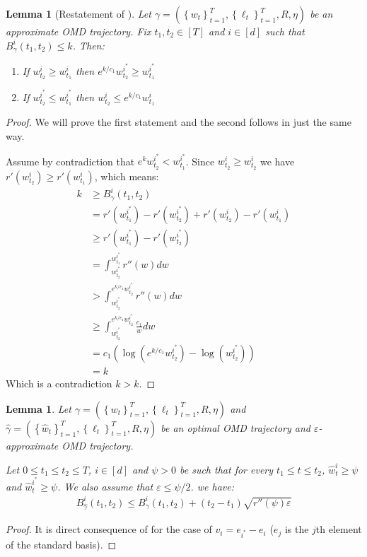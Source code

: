 \documentclass[10pt]{article}
\newtheorem{lemma}[theorem]{Lemma}
\newtheorem*{lemma*}{Lemma}
\theoremstyle{definition}
\theoremstyle{remark}
\renewcommand{\epsilon}{\varepsilon}
\newcommand{\curly}[1]{ {\left\{ #1 \right\}}}
\newcommand{\roundy}[1]{ {\left( #1 \right)}}
\begin{document}
\begin{lemma*}[Restatement of ]\label{lem:balance to frac}
Let $\gamma=(\curly{w_t}_{t=1}^T, \curly{\ell_t}_{t=1}^T, R, \eta)$ be an approximate OMD trajectory. Fix $t_1,t_2\in[T]$ and $i\in [d]$ such that $B_\gamma^i(t_1,t_2) \le k$. Then:
\begin{enumerate}
    \item If $w_{t_2}^i \ge w_{t_1}^i$ then $e^{k/c_1}w_{t_2}^{i^*} \ge w_{t_1}^{i^*}$
    \item If $w_{t_2}^{i^*} \le w_{t_1}^{i^*}$ then $w_{t_2}^i \le e^{k/c_1}w_{t_1}^i$
\end{enumerate}
\end{lemma*}
\begin{proof}
We will prove the first statement and the second follows in just the same way.

Assume by contradiction that $e^kw_{t_2}^{i^*} < w_{t_1}^{i^*}$. Since $w_{t_2}^i \ge w_{t_2}^i$ we have $r'(w_{t_2}^i) \ge r'(w_{t_1}^i)$, which means:
\begin{align*}
    k &\ge B_\gamma^i(t_1,t_2)\\
    &= r'(w_{t_1}^{i^*}) - r'(w_{t_2}^{i^*}) + r'(w_{t_2}^i) - r'(w_{t_1}^i)\\
    &\ge r'(w_{t_1}^{i^*}) - r'(w_{t_2}^{i^*}) \\
    &= \int_{w_{t_2}^{i^*}}^{w_{t_1}^{i^*}}r''(w)dw \\
    &> \int_{w_{t_2}^{i^*}}^{e^{k/c_1}w_{t_2}^{i^*}}r''(w)dw \tag{$r''(w) > 0$}\\
    &\ge \int_{w_{t_2}^{i^*}}^{e^{k/c_1}w_{t_2}^{i^*}}\frac{c_1}{w}dw\\
    &= c_1\roundy{\log\roundy{e^{k/c_1}w_{t_2}^{i^*}} - \log\roundy{w_{t_2}^{i^*}}}\\
    &= k
\end{align*}
Which is a contradiction $k>k$.
\end{proof}

\begin{lemma}\label{lem:simplex_trajectory_diff}
Let $\gamma=(\curly{w_t}_{t=1}^T, \curly{\ell_t}_{t=1}^T, R, \eta)$ and $\hat{\gamma}=(\curly{\hat{w}_t}_{t=1}^T, \curly{\ell_t}_{t=1}^T, R, \eta)$ be an optimal OMD trajectory and $\epsilon$-approximate OMD trajectory.

Let $0\le t_1\le t_2 \le T$, $i\in [d]$ and $\psi>0$ be such that for every $t_1\le t \le t_2$, $\hat{w}_t^i \ge \psi$ and $\hat{w}_t^{i^*} \ge \psi$. We also assume that $\epsilon \le \psi/2$. we have:
\begin{align*}
    B_{\hat{\gamma}}^i(t_1,t_2) \le B_{\gamma}^i(t_1,t_2)  + (t_2-t_1)\sqrt{r''(\psi)\epsilon}
\end{align*}
\end{lemma}
\begin{proof}
It is direct consequence of  for the case of $v_i = e_{i^*} - e_i$ ($e_j$ is the $j$th element of the standard basis).
\end{proof}
\end{document}
